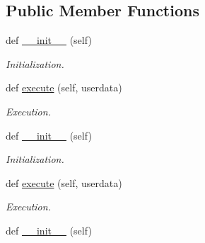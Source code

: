 \subsection*{Public Member Functions}
\begin{DoxyCompactItemize}
\item 
\mbox{\label{classstate__machine_1_1Sleep_a473b93a1ddf11f9e664d1fb694ce1a3c}} 
def \hyperlink{classstate__machine_1_1Sleep_a473b93a1ddf11f9e664d1fb694ce1a3c}{\+\_\+\+\_\+init\+\_\+\+\_\+} (self)
\begin{DoxyCompactList}\small\item\em Initialization. \end{DoxyCompactList}\item 
\mbox{\label{classstate__machine_1_1Sleep_a89527836f1edcefb6467fa9c041fbbfe}} 
def \hyperlink{classstate__machine_1_1Sleep_a89527836f1edcefb6467fa9c041fbbfe}{execute} (self, userdata)
\begin{DoxyCompactList}\small\item\em Execution. \end{DoxyCompactList}\item 
\mbox{\label{classstate__machine_1_1Sleep_a473b93a1ddf11f9e664d1fb694ce1a3c}} 
def \hyperlink{classstate__machine_1_1Sleep_a473b93a1ddf11f9e664d1fb694ce1a3c}{\+\_\+\+\_\+init\+\_\+\+\_\+} (self)
\begin{DoxyCompactList}\small\item\em Initialization. \end{DoxyCompactList}\item 
\mbox{\label{classstate__machine_1_1Sleep_a89527836f1edcefb6467fa9c041fbbfe}} 
def \hyperlink{classstate__machine_1_1Sleep_a89527836f1edcefb6467fa9c041fbbfe}{execute} (self, userdata)
\begin{DoxyCompactList}\small\item\em Execution. \end{DoxyCompactList}\item 
\mbox{\label{classstate__machine_1_1Sleep_a473b93a1ddf11f9e664d1fb694ce1a3c}} 
def \hyperlink{classstate__machine_1_1Sleep_a473b93a1ddf11f9e664d1fb694ce1a3c}{\+\_\+\+\_\+init\+\_\+\+\_\+} (self)

\end{DoxyCompactItemize}
